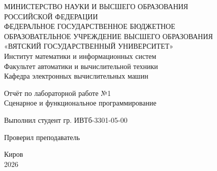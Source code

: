 \documentclass[oneside,a4paper,14pt]{extarticle}
\begin{document}
\newpage
\thispagestyle{empty}

\begin{center}
	МИНИСТЕРСТВО НАУКИ И ВЫСШЕГО ОБРАЗОВАНИЯ\\
	РОССИЙСКОЙ ФЕДЕРАЦИИ\\
	ФЕДЕРАЛЬНОЕ ГОСУДАРСТВЕННОЕ БЮДЖЕТНОЕ\\
	ОБРАЗОВАТЕЛЬНОЕ УЧРЕЖДЕНИЕ ВЫСШЕГО ОБРАЗОВАНИЯ\\
	«ВЯТСКИЙ ГОСУДАРСТВЕННЫЙ УНИВЕРСИТЕТ»\\
	Институт математики и информационных систем\\
	Факультет автоматики и вычислительной техники\\
	Кафедра электронных вычислительных машин
\end{center}

\vspace{20mm}

\begin{center}
	Отчёт по лабораторной работе №1\\
	Сценарное и функциональное программирование
\end{center}

\vfill

Выполнил студент гр. ИВТб-3301-05-00 \hfill {}

Проверил преподаватель \hfill {} \vfill

\begin{center}
	Киров\\
	2026
\end{center}
\end{document}
